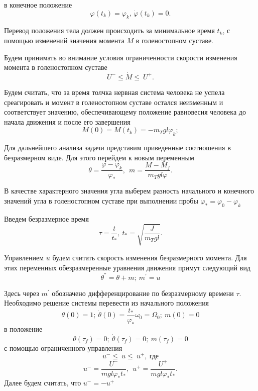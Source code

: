 \documentclass[a4paper,14pt]{article}
\theoremstyle{plain} %
\theoremstyle{definition} %
\theoremstyle{remark} %
\begin{document}
{в конечное положение
\begin{equation}\label{8}
    \varphi(t_k)=\varphi_k,\, \dot{\varphi}(t_k)=0.
\end{equation}

Перевод положения тела должен происходить за минимальное
время $t_k$, с помощью изменений значения момента $M$ в
голеностопном суставе.

Будем принимать во внимание условия ограниченности скорости изменения
момента в голеностопном суставе
\[
    U^-\le\dot{M}\le\ U^+.
\]

Будем считать, что за время толчка нервная система человека
не успела среагировать и момент в голеностопном суставе остался
неизменным и соответствует значению, обеспечивающему положение
равновесия человека до начала движения и после его завершения
\[
    M(0)=M\left(t_k\right)=-m_Tgl\varphi_k;
\]

Для дальнейшего анализа задачи представим приведенные
соотношения в безразмерном виде. Для этого перейдем
к новым переменным
\[
    \theta=\frac{\varphi-\varphi_k}{\varphi_\ast},\ \ m=\frac{M-M_f}{m_Tgl\varphi}.
\]

В качестве характерного значения угла выберем разность
начального и конечного значений угла в голеностопном
суставе при выполнении пробы $\varphi_\ast=\varphi_0-\varphi_k$

Введем безразмерное время
\[
    \tau=\frac{t}{t_\ast},\ t_\ast=\sqrt{\frac{J}{m_Tgl}}.
\]

Управлением $u$ будем считать скорость изменения безразмерного
момента. Для этих переменных обезразмеренные уравнения движения
примут следующий вид
\[
    \theta^{''}=\theta+m;\ m^{'}=u
\]

Здесь через $m^{'}$ обозначено дифференцирование по
безразмерному времени $\tau$. Необходимо решение системы
перевести из начального положения
\begin{equation}\label{9}
    \theta(0)=1;\ \dot{\theta}(0)=\frac{t_\ast}{\varphi_\ast}\omega_0=\Omega_0;\ m(0)=0
\end{equation}
в положение
\begin{equation}\label{9}
    \theta(\tau_f)=0;\ \dot{\theta}(\tau_f)=0;\ m(\tau_f)=0
\end{equation}
с помощью ограниченного управления
\[
    u^-\le\ u\le\ u^+,\ \text{где}
\]
\[
    u^-=\frac{U^-}{mgl\varphi_\ast t_\ast},\ \ u^+=\frac{U^+}{mgl\varphi_\ast t_\ast}.
\]
Далее будем считать, что $u^-=-u^+$
\newpage
}
\end{document}
